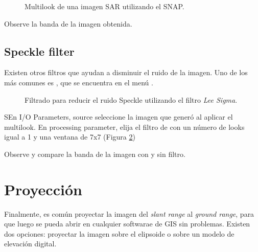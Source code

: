 \begin{figure}[h!]
    \centering
    \hfill
    \caption{Multilook de una imagen SAR utilizando el SNAP.}
    \label{fig:multilook}
\end{figure}

\begin{que}
Observe la banda  de la imagen obtenida.
\end{que}


\subsection{Speckle filter}

Existen otros filtros que ayudan a disminuir el ruido de la imagen. Uno de los más comunes es  , que se encuentra en el menú .

\begin{figure}[h!]
    \centering
    \hfill
    \caption{Filtrado para reducir el ruido Speckle utilizando el filtro \emph{Lee Sigma}.}
    \label{fig:lee}
\end{figure}

SEn I/O Parameters, source seleccione la imagen  que generó al aplicar el multilook. En processing parameter, elija el filtro de  con un número de looks igual a 1 y una ventana de 7x7 (Figura \ref{fig:lee})



\begin{que}
    Observe y compare la banda  de la imagen con y sin filtro.
\end{que}

\section{Proyección}

Finalmente, es común proyectar la imagen del \emph{slant range} al \emph{ground range}, para que luego se pueda abrir en cualquier softwarae de GIS sin problemas. Existen dos opciones: proyectar la imagen sobre el elipsoide o sobre un modelo de elevación digital.

